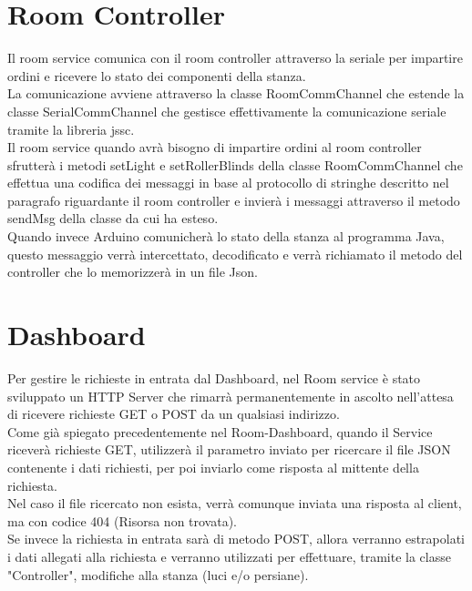 \documentclass[a4paper]{report}
\begin{document}
\vspace{2cm}
\section{Room Controller}
Il room service comunica con il room controller attraverso la seriale per impartire ordini e ricevere lo stato dei componenti della stanza. \\
La comunicazione avviene attraverso la classe RoomCommChannel che estende la classe SerialCommChannel che gestisce effettivamente la comunicazione seriale tramite la libreria jssc. \\
Il room service quando avrà bisogno di impartire ordini al room controller sfrutterà i metodi setLight e setRollerBlinds della classe RoomCommChannel che effettua una codifica dei messaggi in base al protocollo di stringhe descritto nel paragrafo riguardante il room controller e invierà i messaggi attraverso il metodo sendMsg della classe da cui ha esteso. \\
Quando invece Arduino comunicherà lo stato della stanza al programma Java, questo messaggio verrà intercettato, decodificato e verrà richiamato il metodo del controller che lo memorizzerà in un file Json.

\newpage

\section{Dashboard}
Per gestire le richieste in entrata dal Dashboard, nel Room service è stato sviluppato un HTTP Server che rimarrà permanentemente in ascolto nell'attesa di ricevere richieste GET o POST da un qualsiasi indirizzo.\\
Come già spiegato precedentemente nel Room-Dashboard, quando il Service riceverà richieste GET, utilizzerà il parametro inviato per ricercare il file JSON contenente i dati richiesti, per poi inviarlo come risposta al mittente della richiesta.\\
Nel caso il file ricercato non esista, verrà comunque inviata una risposta al client, ma con codice 404 (Risorsa non trovata).\\
Se invece la richiesta in entrata sarà di metodo POST, allora verranno estrapolati i dati allegati alla richiesta e verranno utilizzati per effettuare, tramite la classe "Controller", modifiche alla stanza (luci e/o persiane).

\vspace{2cm}
\end{document}
